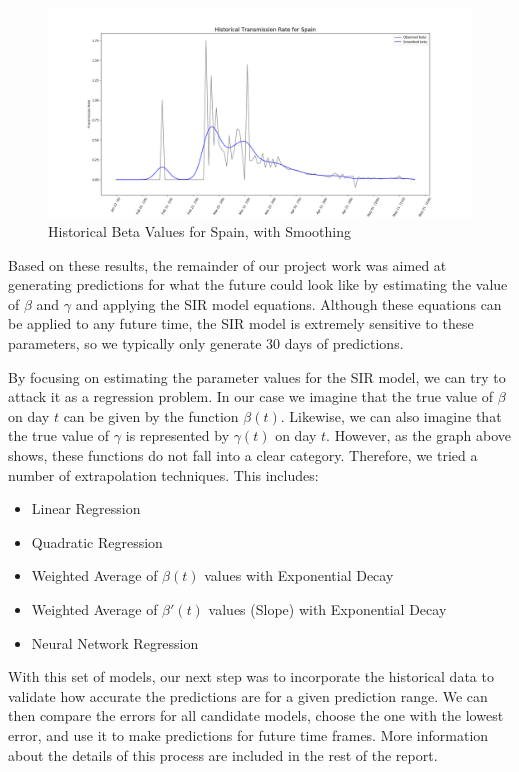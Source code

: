 \documentclass[11pt]{article}
\begin{document}
\begin{figure}[h]
\includegraphics[width=15cm]{images/SampleBetaChart.png}
\centering
\caption{Historical Beta Values for Spain, with Smoothing}
\label{fig:sample-beta}
\end{figure}

Based on these results, the remainder of our project work was aimed at generating predictions for what the future could look like by estimating the value of $\beta$ and $\gamma$ and applying the SIR model equations. Although these equations can be applied to any future time, the SIR model is extremely sensitive to these parameters, so we typically only generate 30 days of predictions.

By focusing on estimating the parameter values for the SIR model, we can try to attack it as a regression problem. In our case we imagine that the true value of $\beta$ on day $t$ can be given by the function $\beta(t)$. Likewise, we can also imagine that the true value of $\gamma$ is represented by $\gamma(t)$ on day $t$. However, as the graph above shows, these functions do not fall into a clear category. Therefore, we tried a number of extrapolation techniques. This includes:

\begin{itemize}
    \item Linear Regression
    \item Quadratic Regression
    \item Weighted Average of $\beta(t)$ values with Exponential Decay
    \item Weighted Average of $\beta'(t)$ values (Slope) with Exponential Decay
    \item Neural Network Regression
\end{itemize}

With this set of models, our next step was to incorporate the historical data to validate how accurate the predictions are for a given prediction range. We can then compare the errors for all candidate models, choose the one with the lowest error, and use it to make predictions for future time frames. More information about the details of this process are included in the rest of the report.
\end{document}
